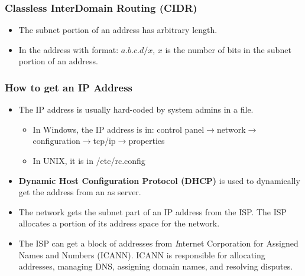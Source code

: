 \documentclass{article}
\begin{document}
\subsubsection{Classless InterDomain Routing (CIDR)}
\begin{itemize}
\item The subnet portion of an address has arbitrary length.
\item In the address with format: $a.b.c.d/x$, $x$ is the number of bits in the subnet portion of an address.
\end{itemize}

\subsubsection{How to get an IP Address}
\begin{itemize}
\item The IP address is usually hard-coded by system admins in a file.
\begin{itemize}
\item In Windows, the IP address is in: control panel$\rightarrow$network$\rightarrow$configuration$\rightarrow$tcp/ip$\rightarrow$properties
\item In UNIX, it is in /etc/rc.config
\end{itemize}
\item {\bf Dynamic Host Configuration Protocol (DHCP)} is used to dynamically get the address from an as server.
\item The network gets the subnet part of an IP address from the ISP. The ISP allocates a portion of its address space for the network.
\item The ISP can get a block of addresses from {\emph Internet Corporation for Assigned Names and Numbers (ICANN)}. ICANN is responsible for allocating addresses, managing DNS, assigning domain names, and resolving disputes.
\end{itemize}

\end{document}
